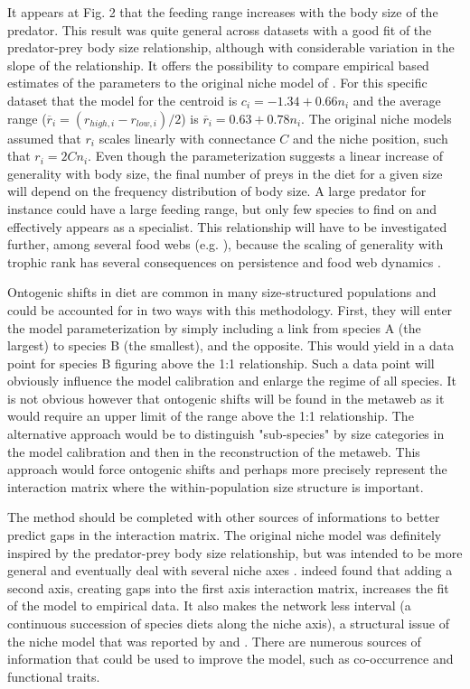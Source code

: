 \documentclass[12pt]{article}
\begin{document}
It appears at Fig. 2 that the feeding range increases with the body size of the
predator. This result was quite general across datasets with a good fit of the
predator-prey body size relationship, although with considerable variation in
the slope of the relationship. It offers the possibility to compare empirical
based estimates of the parameters to the original niche model of
\textcite{Williams2000}. For this specific dataset that the model for the
centroid is $c_i = -1.34 + 0.66n_i$ and the average range
($\overline{r}_i=(r_{high,i} - r_{low,i})/2$) is $\overline{r}_i = 0.63 +
0.78n_i$. The original niche models assumed that $r_i$ scales linearly with
connectance $C$ and the niche position, such that $r_i = 2Cn_i$. Even though the
parameterization suggests a linear increase of generality with body size, the
final number of preys in the diet for a given size will depend on the frequency
distribution of body size. A large predator for instance could have a large
feeding range, but only few species to find on and effectively appears as a
specialist. This relationship will have to be investigated further, among
several food webs (e.g. \textcite{Digel2011}), because the scaling of generality
with trophic rank has several consequences on persistence
\parencite{Gravel2011b} and food web dynamics \parencite{Brose2006,Berlow2009}.

Ontogenic shifts in diet are common in many size-structured populations and
could be accounted for in two ways with this methodology. First, they will enter
the model parameterization by simply including a link from species A (the
largest) to species B (the smallest), and the opposite. This would yield in a
data point for species B figuring above the 1:1 relationship. Such a data point
will obviously influence the model calibration and enlarge the regime of all
species. It is not obvious however that ontogenic shifts will be found in the
metaweb as it would require an upper limit of the range above the 1:1
relationship. The alternative approach would be to distinguish "sub-species" by
size categories in the model calibration and then in the reconstruction of the
metaweb. This approach would force ontogenic shifts and perhaps more precisely
represent the interaction matrix where the within-population size structure is
important.

The method should be completed with other sources of informations to better
predict gaps in the interaction matrix. The original niche model was definitely
inspired by the predator-prey body size relationship, but was intended to be
more general and eventually deal with several niche axes
\parencite{Williams2000}. \textcite{Allesina2008} indeed found that adding a
second axis, creating gaps into the first axis interaction matrix, increases the
fit of the model to empirical data. It also makes the network less interval (a
continuous succession of species diets along the niche axis), a structural issue
of the niche model that was reported by \textcite{Cattin2004} and
\textcite{Bersier2006}. There are numerous sources of information that could be
used to improve the model, such as co-occurrence and functional traits.
\end{document}
